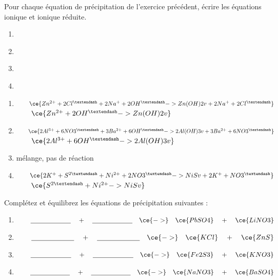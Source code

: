\documentclass[
  11pt,
  a4paper,
  openany]{book}
\begin{document}
\begin{Exercise}

Pour chaque équation de précipitation de l'exercice précédent, écrire les équations ionique et ionique réduite.

\begin{enumerate}
\def\labelenumi{\arabic{enumi}.}
\item
  ~
\item
  ~
\item
  ~
\item
  ~
\end{enumerate}

\end{Exercise}

\begin{Answer}

\begin{enumerate}
\def\labelenumi{\arabic{enumi}.}
\item
  \(\qquad \ce{Zn^{2+} + 2Cl^{–} + 2Na^{+} + 2OH^{–} -> Zn(OH)2 v + 2Na^{+} + 2Cl^{–}}\)\\
  \(\qquad \ce{Zn^{2+} + 2OH^{–} -> Zn(OH)2 v}\)
\item
  \(\qquad \ce{ 2Al^{3+} + 6NO3^{–} + 3Ba^{2+} + 6OH^{–} -> 2Al(OH)3 v + 3Ba^{2+} + 6NO3^{–}}\)\\
  \(\qquad \ce{ 2Al^{3+} + 6OH^{–} -> 2Al(OH)3 v}\)
\item
  mélange, pas de réaction
\item
  \(\qquad \ce{2K^{+} + S^{2–} + Ni^{2+} + 2NO3^{–} -> NiS v + 2K^{+} + NO3^{–}}\)\\
  \(\qquad \ce{S^{2–} + Ni^{2+} -> NiS v}\)
\end{enumerate}

\end{Answer}

\begin{Exercise}

Complétez et équilibrez les équations de précipitation suivantes :

\begin{enumerate}
\def\labelenumi{\arabic{enumi}.}
\item
  \(\qquad \underline{\hspace{6em}} \quad + \quad \underline{\hspace{6em}} \quad \ce{->} \quad \ce{PbSO4} \quad + \quad \ce{LiNO3}\)
\item
  \(\qquad \underline{\hspace{6em}} \quad + \quad \underline{\hspace{6em}} \quad \ce{->} \quad \ce{KCl} \quad + \quad \ce{ZnS}\)
\item
  \(\qquad \underline{\hspace{6em}} \quad + \quad \underline{\hspace{6em}} \quad \ce{->} \quad \ce{Fe2S3} \quad + \quad \ce{KNO3}\)
\item
  \(\qquad \underline{\hspace{6em}} \quad + \quad \underline{\hspace{6em}} \quad \ce{->} \quad \ce{NaNO3} \quad + \quad \ce{BaSO4}\)
\end{enumerate}

\end{Exercise}
\end{document}
